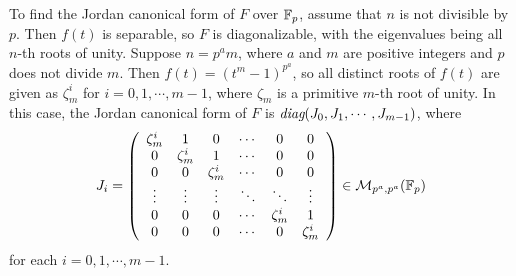 \begin{sol}
\begin{enumerate}
{            To find the Jordan canonical form of $F$ over ${\mathbb{F}}_p$, assume that $n$ is not divisible by $p$.
            Then $f(t)$ is separable, so $F$ is diagonalizable, with the eigenvalues being all $n$-th roots of unity.
            Suppose $n=p^a m$, where $a$ and $m$ are positive integers and $p$ does not divide $m$.
            Then $f(t)=(t^m-1)^{p^a}$, so all distinct roots of $f(t)$ are given as $\zeta_m^i$ for $i=0, 1, \cdots, m-1$, where $\zeta_m$ is a primitive $m$-th root of unity.
            In this case, the Jordan canonical form of $F$ is $\textit{diag}(J_0, J_1, \cdots, J_{m-1})$, where
            \begin{align*}
                J_i=
                \left(\begin{array}{ccccccc}
                    \zeta_m^i   &   1   &   0    &   \cdots  &   0   &   0   \\
                        0   &\zeta_m^i  &   1    &   \cdots  &   0   &   0   \\
                        0   &   0   &\zeta_m^i   &   \cdots  &   0   &   0   \\
                    \vdots  &\vdots &\vdots      &   \ddots  &\ddots &\vdots \\
                        0   &   0   &   0    &   \cdots  &\zeta_m^i  &   1   \\
                        0   &   0   &   0    &   \cdots      &   0   &\zeta_m^i
                \end{array}\right)
                \in{\mathcal{M}}_{p^a, p^a}({\mathbb{F}}_p)
            \end{align*}
            for each $i=0, 1, \cdots, m-1$.
        }
    \end{enumerate}
\end{sol}
